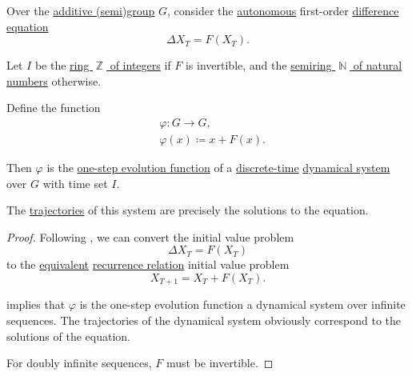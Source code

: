 \begin{proposition}\label{thm:autonomous_difference_equation_as_dynamical_system}
  Over the \hyperref[con:additive_semigroup]{additive (semi)group} \( G \), consider the \hyperref[def:difference_equation/autonomous]{autonomous} first-order \hyperref[def:difference_equation]{difference equation}
  \begin{equation*}
    \Delta X_T = F(X_T).
  \end{equation*}

  Let \( I \) be the \hyperref[def:integers]{ring \( \BbbZ \) of integers} if \( F \) is invertible, and the \hyperref[def:natural_numbers]{semiring \( \BbbN \) of natural numbers} otherwise.

  Define the function
  \begin{equation*}
    \begin{aligned}
      &\varphi: G \to G, \\
      &\varphi(x) \coloneqq x + F(x).
    \end{aligned}
  \end{equation*}

  Then \( \varphi \) is the \hyperref[def:one_step_evolution_function]{one-step evolution function} of a \hyperref[def:discrete_dynamical_system]{discrete-time} \hyperref[def:dynamical_system]{dynamical system} over \( G \) with time set \( I \).

  The \hyperref[def:dynamical_system_trajectory]{trajectories} of this system are precisely the solutions to the equation.
\end{proposition}
\begin{proof}
  Following , we can convert the initial value problem
  \begin{equation*}
    \Delta X_T = F(X_T)
  \end{equation*}
  to the \hyperref[def:equation/equivalent]{equivalent} \hyperref[def:recurrence_relation]{recurrence relation} initial value problem
  \begin{equation*}
    X_{T+1} = X_T + F(X_T).
  \end{equation*}

   implies that \( \varphi \) is the one-step evolution function a dynamical system over infinite sequences. The trajectories of the dynamical system obviously correspond to the solutions of the equation.

  For doubly infinite sequences, \( F \) must be invertible.
\end{proof}
